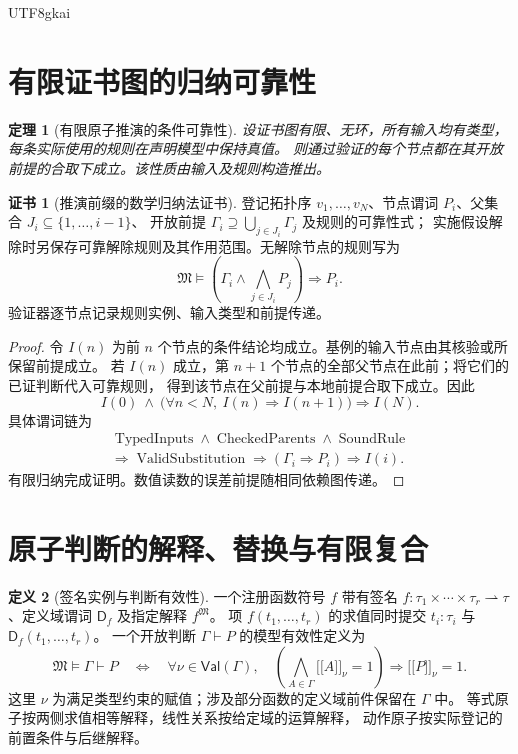 \documentclass[12pt,a4paper,openany,notitlepage]{report}
\theoremstyle{plain}
\newtheorem{theorem}{定理}[chapter]
\theoremstyle{definition}
\newtheorem{definition}[theorem]{定义}
\newtheorem*{certificate}{证书}
\theoremstyle{remark}
\begin{document}
\begin{CJK*}{UTF8}{gkai}
\section{有限证书图的归纳可靠性}

\begin{theorem}[有限原子推演的条件可靠性]
\label{hgov:thm:atomsound}
设证书图有限、无环，所有输入均有类型，每条实际使用的规则在声明模型中保持真值。
则通过验证的每个节点都在其开放前提的合取下成立。该性质由输入及规则构造推出。
\end{theorem}
\begin{certificate}[推演前缀的数学归纳法证书]
登记拓扑序 $v_1,\ldots,v_N$、节点谓词 $P_i$、父集合 $J_i\subseteq\{1,\ldots,i-1\}$、
开放前提 $\Gamma_i\supseteq\bigcup_{j\in J_i}\Gamma_j$ 及规则的可靠性式；
实施假设解除时另保存可靠解除规则及其作用范围。无解除节点的规则写为
\[
\mathfrak M\models
\left(\Gamma_i\land\bigwedge_{j\in J_i}P_j\right)\Rightarrow P_i.
\]
验证器逐节点记录规则实例、输入类型和前提传递。
\end{certificate}
\begin{proof}
令 $I(n)$ 为前 $n$ 个节点的条件结论均成立。基例的输入节点由其核验或所保留前提成立。
若 $I(n)$ 成立，第 $n+1$ 个节点的全部父节点在此前；将它们的已证判断代入可靠规则，
得到该节点在父前提与本地前提合取下成立。因此
\[
I(0)\ \land\
\bigl(\forall n<N,\ I(n)\Rightarrow I(n+1)\bigr)
\Rightarrow I(N).
\]
具体谓词链为
\[
\begin{gathered}
\operatorname{TypedInputs}\land\operatorname{CheckedParents}
\land\operatorname{SoundRule}\\
\Rightarrow\operatorname{ValidSubstitution}
\Rightarrow(\Gamma_i\Rightarrow P_i)
\Rightarrow I(i).
\end{gathered}
\]
有限归纳完成证明。数值读数的误差前提随相同依赖图传递。
\end{proof}

\section{原子判断的解释、替换与有限复合}

\begin{definition}[签名实例与判断有效性]
\label{exp:logic:signature}
一个注册函数符号 $f$ 带有签名
$f:\tau_1\times\cdots\times\tau_r\rightharpoonup\tau$、定义域谓词
$\mathsf D_f$ 及指定解释 $f^{\mathfrak M}$。
项 $f(t_1,\ldots,t_r)$ 的求值同时提交
$t_i:\tau_i$ 与 $\mathsf D_f(t_1,\ldots,t_r)$。
一个开放判断 $\Gamma\vdash P$ 的模型有效性定义为
\[
 \mathfrak M\models\Gamma\vdash P
 \quad\Longleftrightarrow\quad
 \forall\nu\in\mathsf{Val}(\Gamma),\quad
 \left(\bigwedge_{A\in\Gamma}\lbrack\!\lbrack A\rbrack\!\rbrack_\nu=1\right)
 \Rightarrow\lbrack\!\lbrack P\rbrack\!\rbrack_\nu=1.
\]
这里 $\nu$ 为满足类型约束的赋值；涉及部分函数的定义域前件保留在 $\Gamma$ 中。
等式原子按两侧求值相等解释，线性关系按给定域的运算解释，
动作原子按实际登记的前置条件与后继解释。
\end{definition}


\end{CJK*}
\end{document}
